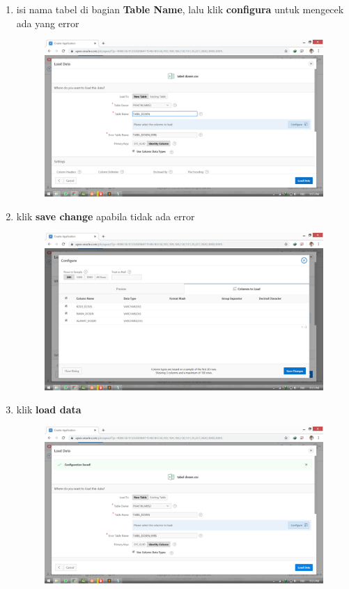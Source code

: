 \documentclass[11pt]{article}
\begin{document}
\begin{enumerate}
\newpage
\item isi nama tabel di bagian \textbf{Table Name}, lalu klik \textbf{configura} untuk mengecek ada yang error
	\begin{figure}[h]
        \centerline{\includegraphics[scale=0.1]{img/6.png}}
        \centering
        \caption{}
		\label{langkah12}
	\end{figure}
	

\item klik \textbf{save change} apabila tidak ada error
	\begin{figure}[h]
        \centerline{\includegraphics[scale=0.1]{img/7.png}}
        \centering
        \caption{}
		\label{langkah13}
	\end{figure}

\newpage	
\item klik \textbf{load data}
	\begin{figure}[h]
        \centerline{\includegraphics[scale=0.1]{img/8.png}}
        \centering
        \caption{}
		\label{langkah14}
	\end{figure}
	

\end{enumerate}
\end{document}
